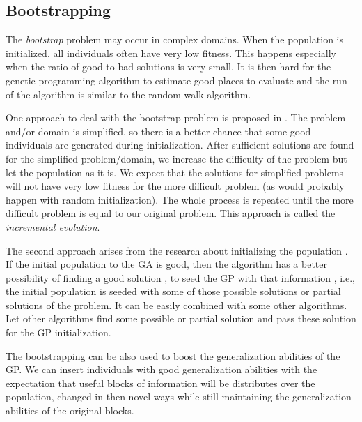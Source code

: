  \subsection{Bootstrapping} 
 The \emph{bootstrap} problem may occur in complex domains. When the population is initialized, all individuals often have very low fitness. This happens especially when the ratio of good to bad solutions is very small. It is then hard for the genetic programming algorithm to estimate good places to evaluate and the run of the algorithm is similar to the random walk algorithm. 
 
 One approach to deal with the bootstrap problem is proposed in \cite{bootstrapIncrementalEvolution}. The problem and/or domain is simplified, so there is a better chance that some good individuals are generated during initialization. After sufficient solutions are found for the simplified problem/domain, we increase the difficulty of the problem but let the population as it is. We expect that the solutions for simplified problems will not have very low fitness for the more difficult problem (as would probably happen with random initialization). The whole process is repeated until the more difficult problem is equal to our original problem. This approach is called the \emph{incremental evolution}.  
 
 The second approach arises from the research about initializing the population \cite{initialpopulationMetricApproach}. If the initial population to the GA is good, then the algorithm has a better possibility of finding a good solution \cite{DiversityAnalysisOfMeasuresAndCorrelationWithFitness}, \cite{ComparisonOfMultiobjectiveEvolutionaryAlgorithm} to seed the GP with that information \cite{GAInitSeedHuntingSnakes}, i.e., the initial population is seeded with some of those possible solutions or partial solutions of the problem. It can be easily combined with some other algorithms. Let other algorithms find some possible or partial solution and pass these solution for the GP initialization.
 
 The bootstrapping can be also used to boost the generalization abilities of the GP. We can insert individuals with good generalization abilities with the expectation that useful blocks of information will be distributes over the population, changed in then novel ways while still maintaining the generalization abilities of the original blocks.

